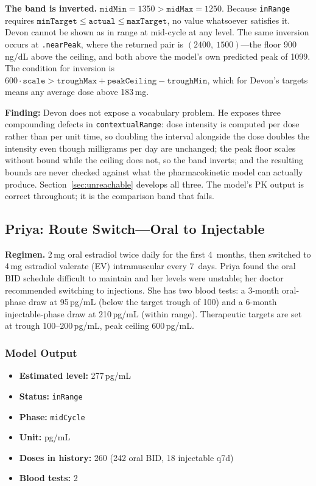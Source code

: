 \documentclass[11pt,a4paper]{article}
\newcommand{\code}[1]{\texttt{\small #1}}
\begin{document}
\textbf{The band is inverted.} $\texttt{midMin} = 1350 >
\texttt{midMax} = 1250$. Because \code{inRange} requires
$\texttt{minTarget} \le \texttt{actual} \le \texttt{maxTarget}$, no value
whatsoever satisfies it. Devon cannot be shown as in range at mid-cycle at
any level. The same inversion occurs at \code{.nearPeak}, where the returned
pair is $(2400,\ 1500)$---the floor 900\,ng/dL above the ceiling, and both
above the model's own predicted peak of 1099. The condition for inversion is
$600 \cdot \texttt{scale} > \texttt{troughMax} + \texttt{peakCeiling} -
\texttt{troughMin}$, which for Devon's targets means any average dose above
183\,mg.

\textbf{Finding:} Devon does not expose a vocabulary problem. He exposes
three compounding defects in \code{contextualRange}: dose intensity is
computed per dose rather than per unit time, so doubling the interval
alongside the dose doubles the intensity even though milligrams per day are
unchanged; the peak floor scales without bound while the ceiling does not,
so the band inverts; and the resulting bounds are never checked against what
the pharmacokinetic model can actually produce. Section~\ref{sec:unreachable}
develops all three. The model's PK output is correct throughout; it is the
comparison band that fails.

\subsection{Priya: Route Switch---Oral to Injectable}
\label{sec:priya}

\textbf{Regimen.} 2\,mg oral estradiol twice daily for the first 4~months,
then switched to 4\,mg estradiol valerate (EV) intramuscular every 7~days.
Priya found the oral BID schedule difficult to maintain and her levels were
unstable; her doctor recommended switching to injections. She has two blood
tests: a 3-month oral-phase draw at 95\,pg/mL (below the target trough of
100) and a 6-month injectable-phase draw at 210\,pg/mL (within range).
Therapeutic targets are set at trough 100--200\,pg/mL, peak ceiling
600\,pg/mL.

\subsubsection{Model Output}

\begin{itemize}[nosep,leftmargin=1.4em]
\item \textbf{Estimated level:} 277\,pg/mL
\item \textbf{Status:} \code{inRange}
\item \textbf{Phase:} \code{midCycle}
\item \textbf{Unit:} pg/mL
\item \textbf{Doses in history:} 260 (242 oral BID, 18 injectable q7d)
\item \textbf{Blood tests:} 2
\end{itemize}
\end{document}
